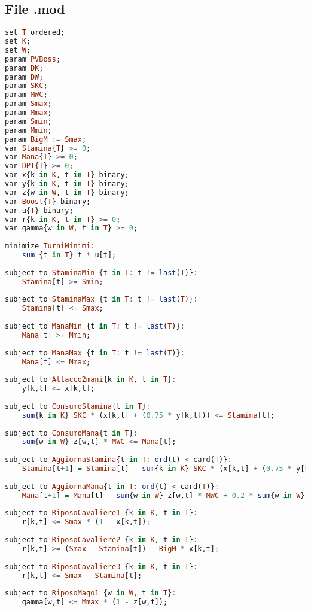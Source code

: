 \documentclass[12pt]{article}
\begin{document}
\subsection{File .mod}
\begin{lstlisting}[language=haskell, frame=single, caption={Modello in Ampl}, captionpos=b, keywordstyle=\color{purple}]  
set T ordered;
set K; 
set W;    
param PVBoss;
param DK;
param DW;
param SKC;
param MWC;
param Smax;
param Mmax;
param Smin;
param Mmin;
param BigM := Smax;    
var Stamina{T} >= 0;
var Mana{T} >= 0;
var DPT{T} >= 0;
var x{k in K, t in T} binary;  
var y{k in K, t in T} binary;  
var z{w in W, t in T} binary;  
var Boost{T} binary;
var u{T} binary;    
var r{k in K, t in T} >= 0;    
var gamma{w in W, t in T} >= 0; 
    
minimize TurniMinimi:
    sum {t in T} t * u[t];
    
subject to StaminaMin {t in T: t != last(T)}: 
    Stamina[t] >= Smin;
    
subject to StaminaMax {t in T: t != last(T)}: 
    Stamina[t] <= Smax;
    
subject to ManaMin {t in T: t != last(T)}: 
    Mana[t] >= Mmin;
    
subject to ManaMax {t in T: t != last(T)}: 
    Mana[t] <= Mmax;
    
subject to Attacco2mani{k in K, t in T}:
    y[k,t] <= x[k,t];
    
subject to ConsumoStamina{t in T}:
    sum{k in K} SKC * (x[k,t] + (0.75 * y[k,t])) <= Stamina[t];
    
subject to ConsumoMana{t in T}:
    sum{w in W} z[w,t] * MWC <= Mana[t];
    
subject to AggiornaStamina{t in T: ord(t) < card(T)}:
    Stamina[t+1] = Stamina[t] - sum{k in K} SKC * (x[k,t] + (0.75 * y[k,t])) + 0.3 * sum{k in K} r[k,t];
    
subject to AggiornaMana{t in T: ord(t) < card(T)}:
    Mana[t+1] = Mana[t] - sum{w in W} z[w,t] * MWC + 0.2 * sum{w in W} gamma[w,t];
    
subject to RiposoCavaliere1 {k in K, t in T}:
    r[k,t] <= Smax * (1 - x[k,t]);
    
subject to RiposoCavaliere2 {k in K, t in T}:
    r[k,t] >= (Smax - Stamina[t]) - BigM * x[k,t];
    
subject to RiposoCavaliere3 {k in K, t in T}:
    r[k,t] <= Smax - Stamina[t];
    
subject to RiposoMago1 {w in W, t in T}:
    gamma[w,t] <= Mmax * (1 - z[w,t]);
    

\end{lstlisting}
\end{document}
